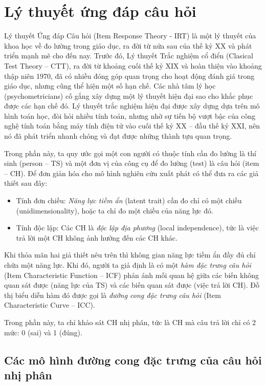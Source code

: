 \section{Lý thuyết ứng đáp câu hỏi}
Lý thuyết Ứng đáp Câu hỏi (Item Response Theory - IRT) là một lý thuyết của khoa học về đo lường trong giáo dục, ra đời từ nửa sau của thế kỷ XX và phát triển mạnh mẽ cho đến nay. Trước đó, Lý thuyết Trắc nghiệm cổ điển (Clasical Test Theory – CTT), ra đời từ khoảng cuối thế kỷ XIX và hoàn thiện vào khoảng thập niên 1970, đã có nhiều đóng góp quan trọng cho hoạt động đánh giá trong giáo dục, nhưng cũng thể hiện một số hạn chế. Các nhà tâm lý học (psychometricians) cố gắng xây dựng một lý thuyết hiện đại sao cho khắc phục được các hạn chế đó. Lý thuyết trắc nghiệm hiện đại được xây dựng dựa trên mô hình toán học, đòi hỏi nhiều tính toán, nhưng nhờ sự tiến bộ vượt bậc của công nghệ tính toán bằng máy tính điện tử vào cuối thế kỷ XX – đầu thế kỷ XXI, nên nó đã phát triển nhanh chóng và đạt được những thành tựu quan trọng.\par
Trong phần này, ta quy ước gọi một con người có thuộc tính cần đo lường là thí sinh (person – TS) và một đơn vị của công cụ để đo lường (test) là câu hỏi (item – CH). Để đơn giản hóa cho mô hình nghiên cứu xuất phát có thể đưa ra các giả thiết sau đây:\par
\begin{itemize}
	\item Tính đơn chiều: \textit{Năng lực tiềm ẩn} (latent trait) cần đo chỉ có một chiều (unidimensionality), hoặc ta chỉ đo một chiều của năng lực đó.
	\item Tính độc lập: Các CH là \textit{độc lập địa phương} (local independence), tức là việc trả lời một CH không ảnh hưởng đến các CH khác.
\end{itemize}
Khi thỏa mãn hai giả thiết nêu trên thì không gian năng lực tiềm ẩn đầy đủ chỉ chứa một năng lực. Khi đó, người ta giả định là có một \textit{hàm đặc trưng câu hỏi} (Item Characteristic Function – ICF) phản ánh mối quan hệ giữa các biến không quan sát được (năng lực của TS) và các biến quan sát được (việc trả lời CH). Đồ thị biểu diễn hàm đó được gọi là \textit{đường cong đặc trưng câu hỏi} (Item Characteristic Curve – ICC).\par
Trong phần này, ta chỉ khảo sát CH nhị phân, tức là CH mà câu trả lời chỉ có 2 mức: 0 (sai) và 1 (đúng).

\subsection{Các mô hình đường cong đặc trưng của câu hỏi nhị phân}
